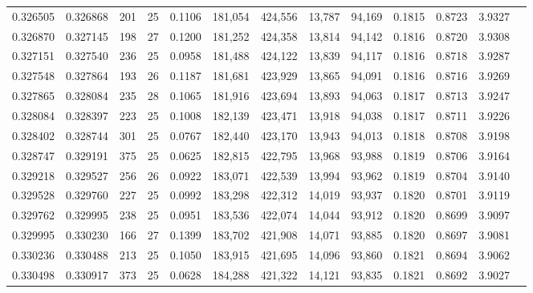 \begin{tabular}{rrrrrrrrrrrrr}
0.326505 & 0.326868 &   201 &  25 &                                     0.1106 & 181,054 & 424,556 &  13,787 &  94,169 & 0.1815 & 0.8723 & 3.9327 \\
0.326870 & 0.327145 &   198 &  27 &                                     0.1200 & 181,252 & 424,358 &  13,814 &  94,142 & 0.1816 & 0.8720 & 3.9308 \\
0.327151 & 0.327540 &   236 &  25 &                                     0.0958 & 181,488 & 424,122 &  13,839 &  94,117 & 0.1816 & 0.8718 & 3.9287 \\
0.327548 & 0.327864 &   193 &  26 &                                     0.1187 & 181,681 & 423,929 &  13,865 &  94,091 & 0.1816 & 0.8716 & 3.9269 \\
0.327865 & 0.328084 &   235 &  28 &                                     0.1065 & 181,916 & 423,694 &  13,893 &  94,063 & 0.1817 & 0.8713 & 3.9247 \\
0.328084 & 0.328397 &   223 &  25 &                                     0.1008 & 182,139 & 423,471 &  13,918 &  94,038 & 0.1817 & 0.8711 & 3.9226 \\
0.328402 & 0.328744 &   301 &  25 &                                     0.0767 & 182,440 & 423,170 &  13,943 &  94,013 & 0.1818 & 0.8708 & 3.9198 \\
0.328747 & 0.329191 &   375 &  25 &                                     0.0625 & 182,815 & 422,795 &  13,968 &  93,988 & 0.1819 & 0.8706 & 3.9164 \\
0.329218 & 0.329527 &   256 &  26 &                                     0.0922 & 183,071 & 422,539 &  13,994 &  93,962 & 0.1819 & 0.8704 & 3.9140 \\
0.329528 & 0.329760 &   227 &  25 &                                     0.0992 & 183,298 & 422,312 &  14,019 &  93,937 & 0.1820 & 0.8701 & 3.9119 \\
0.329762 & 0.329995 &   238 &  25 &                                     0.0951 & 183,536 & 422,074 &  14,044 &  93,912 & 0.1820 & 0.8699 & 3.9097 \\
0.329995 & 0.330230 &   166 &  27 &                                     0.1399 & 183,702 & 421,908 &  14,071 &  93,885 & 0.1820 & 0.8697 & 3.9081 \\
0.330236 & 0.330488 &   213 &  25 &                                     0.1050 & 183,915 & 421,695 &  14,096 &  93,860 & 0.1821 & 0.8694 & 3.9062 \\
0.330498 & 0.330917 &   373 &  25 &                                     0.0628 & 184,288 & 421,322 &  14,121 &  93,835 & 0.1821 & 0.8692 & 3.9027 \\

\end{tabular}
